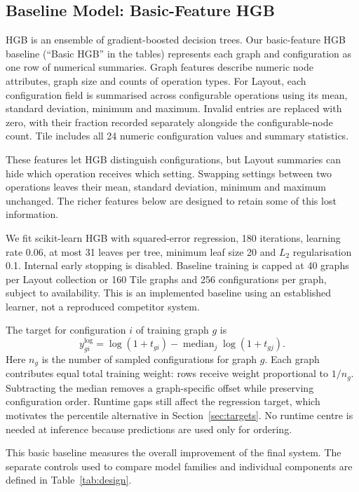 \documentclass[letterpaper]{article}
\begin{document}
\subsection{Baseline Model: Basic-Feature HGB}
\label{sec:baseline}
HGB is an ensemble of gradient-boosted decision trees. Our basic-feature HGB baseline (``Basic HGB'' in the tables) represents each graph and configuration as one row of numerical summaries. Graph features describe numeric node attributes, graph size and counts of operation types. For Layout, each configuration field is summarised across configurable operations using its mean, standard deviation, minimum and maximum. Invalid entries are replaced with zero, with their fraction recorded separately alongside the configurable-node count. Tile includes all 24 numeric configuration values and summary statistics.

These features let HGB distinguish configurations, but Layout summaries can hide which operation receives which setting. Swapping settings between two operations leaves their mean, standard deviation, minimum and maximum unchanged. The richer features below are designed to retain some of this lost information.

We fit scikit-learn HGB with squared-error regression, 180 iterations, learning rate 0.06, at most 31 leaves per tree, minimum leaf size 20 and $L_2$ regularisation 0.1. Internal early stopping is disabled. Baseline training is capped at 40 graphs per Layout collection or 160 Tile graphs and 256 configurations per graph, subject to availability. This is an implemented baseline using an established learner, not a reproduced competitor system.

The target for configuration $i$ of training graph $g$ is
\begin{equation}
y^{\log}_{gi}=\log(1+t_{gi})-\operatorname{median}_{j}\log(1+t_{gj}).
\label{eq:log}
\end{equation}
Here $n_g$ is the number of sampled configurations for graph $g$. Each graph contributes equal total training weight: rows receive weight proportional to $1/n_g$. Subtracting the median removes a graph-specific offset while preserving configuration order. Runtime gaps still affect the regression target, which motivates the percentile alternative in Section~\ref{sec:targets}. No runtime centre is needed at inference because predictions are used only for ordering.

This basic baseline measures the overall improvement of the final system. The separate controls used to compare model families and individual components are defined in Table~\ref{tab:design}.
\end{document}
